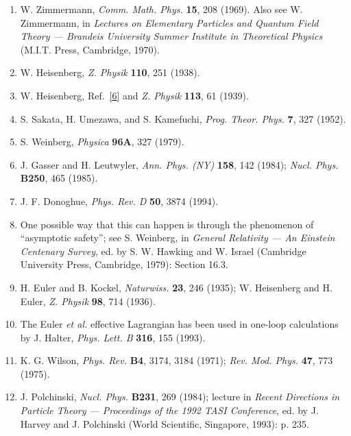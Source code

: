\begin{enumerate}
\item\label{ref:12.8} W. Zimmermann, \emph{Comm. Math. Phys.} \textbf{15}, 208
(1969). Also see W. Zimmermann, in \emph{Lectures on Elementary Particles and
Quantum Field Theory --- Brandeis University Summer Institute in Theoretical
Physics} (M.I.T. Press, Cambridge, 1970).

\item\label{ref:12.9} W. Heisenberg, \emph{Z. Physik} \textbf{110}, 251
(1938).

\item\label{ref:12.10} W. Heisenberg,
Ref.~\hyperref[ref:12.6]{[6]} and \emph{Z. Physik} \textbf{113},
61 (1939).

\item\label{ref:12.11} S. Sakata, H. Umezawa, and S. Kamefuchi,
\emph{Prog. Theor. Phys.} \textbf{7}, 327 (1952).

\item\label{ref:12.12} S. Weinberg, \emph{Physica} \textbf{96A}, 327 (1979).

\item\label{ref:12.13} J. Gasser and H. Leutwyler, \emph{Ann. Phys. (NY)}
\textbf{158}, 142 (1984); \emph{Nucl. Phys.} \textbf{B250}, 465 (1985).

\item\label{ref:12.14} J. F. Donoghue, \emph{Phys. Rev. D} \textbf{50}, 3874
(1994).

\item\label{ref:12.15} One possible way that this can happen is through the
phenomenon of \textquotedblleft asymptotic safety\textquotedblright; see
S. Weinberg, in \emph{General Relativity --- An Einstein Centenary Survey},
ed. by S. W. Hawking and W. Israel (Cambridge University Press, Cambridge,
1979): Section 16.3.

\item\label{ref:12.16} H. Euler and B. Kockel, \emph{Naturwiss.} \textbf{23},
246 (1935); W. Heisenberg and H. Euler, \emph{Z. Physik} \textbf{98}, 714
(1936).

\item\label{ref:12.17} The Euler \emph{et al.} effective Lagrangian has been
used in one-loop calculations by J. Halter, \emph{Phys. Lett. B} \textbf{316},
155 (1993).

\item\label{ref:12.18} K. G. Wilson, \emph{Phys. Rev.} \textbf{B4}, 3174, 3184
(1971); \emph{Rev. Mod. Phys.} \textbf{47}, 773 (1975).

\item\label{ref:12.19} J. Polchinski, \emph{Nucl. Phys.} \textbf{B231}, 269
(1984); lecture in \emph{Recent Directions in Particle Theory --- Proceedings
of the 1992 TASI Conference}, ed. by J. Harvey and J. Polchinski (World
Scientific, Singapore, 1993): p. 235.


\end{enumerate}
